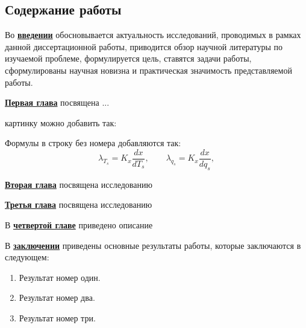 
\subsection*{\Large Содержание работы}
Во \underline{\textbf{введении}} обосновывается актуальность исследований, проводимых в рамках данной диссертационной работы, приводится обзор научной литературы по изучаемой проблеме, формулируется цель, ставятся задачи работы, сформулированы научная новизна и практическая значимость представляемой работы.

\underline{\textbf{Первая глава}} посвящена ...

 картинку можно добавить так:

Формулы в строку без номера добавляются так:
$$
  \lambda_{T_s} = K_x\frac{d{x}}{d{T_s}}, \qquad
  \lambda_{q_s} = K_x\frac{d{x}}{d{q_s}},
$$

\underline{\textbf{Вторая глава}} посвящена исследованию 

\underline{\textbf{Третья глава}} посвящена исследованию 

В \underline{\textbf{четвертой главе}} приведено описание 

В \underline{\textbf{заключении}} приведены основные результаты работы, которые заключаются в следующем:
\begin{enumerate}
 \item Результат номер один.
 \item Результат номер два.
 \item Результат номер три.
\end{enumerate}


\renewcommand{\refname}{\Large Публикации автора по теме диссертации}
